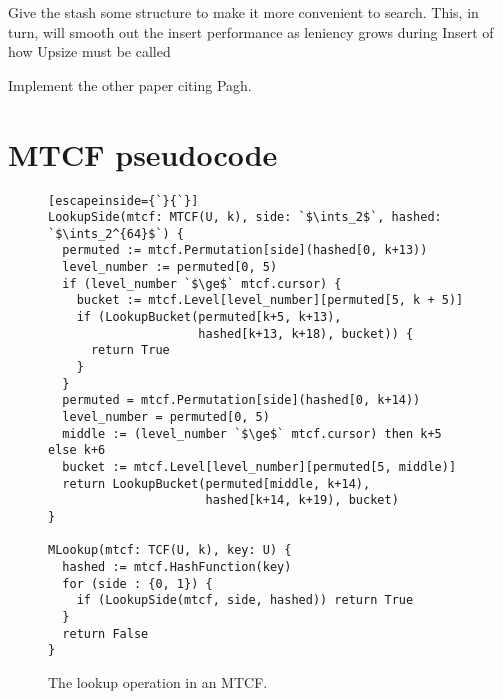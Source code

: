 \documentclass[manuscript,screen,review]{acmart}
\newcommand{\ints}{\mathbb{Z}}
\begin{document}
Give the stash some structure to make it more convenient to search.
This, in turn, will smooth out the insert performance as leniency grows during Insert of how Upsize must be called

Implement the other paper citing Pagh.






\appendix
\section{MTCF pseudocode}
\label{mtcf-appendix}

\begin{figure}%

\begin{lstlisting}[escapeinside={`}{`}]
LookupSide(mtcf: MTCF(U, k), side: `$\ints_2$`, hashed: `$\ints_2^{64}$`) {
  permuted := mtcf.Permutation[side](hashed[0, k+13))
  level_number := permuted[0, 5)
  if (level_number `$\ge$` mtcf.cursor) {
    bucket := mtcf.Level[level_number][permuted[5, k + 5)]
    if (LookupBucket(permuted[k+5, k+13),
                     hashed[k+13, k+18), bucket)) {
      return True
    }
  }
  permuted = mtcf.Permutation[side](hashed[0, k+14))
  level_number = permuted[0, 5)
  middle := (level_number `$\ge$` mtcf.cursor) then k+5 else k+6
  bucket := mtcf.Level[level_number][permuted[5, middle)]
  return LookupBucket(permuted[middle, k+14),
                      hashed[k+14, k+19), bucket)
}

MLookup(mtcf: TCF(U, k), key: U) {
  hashed := mtcf.HashFunction(key)
  for (side : {0, 1}) {
    if (LookupSide(mtcf, side, hashed)) return True
  }
  return False
}
\end{lstlisting}
\caption{The lookup operation in an MTCF.}

\end{figure}
\end{document}
